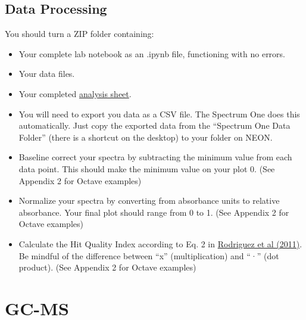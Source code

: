 \documentclass[]{tufte-book}
\providecommand{\tightlist}{%
  \setlength{\itemsep}{0pt}\setlength{\parskip}{0pt}}
\begin{document}
\hypertarget{data-processing-6}{%
\subsection{Data Processing}\label{data-processing-6}}

\begin{marginfigure}
You should turn a ZIP folder containing:

\begin{itemize}
\tightlist
\item
  Your complete lab notebook as an .ipynb file, functioning with no
  errors.\\
\item
  Your data files.\\
\item
  Your completed
  \href{https://github.com/alphonse/alphonse.github.io/raw/master/devel/chem370/assignments/excel-templates/rotation_ftir_data-analysis.xlsx}{analysis
  sheet}.
\end{itemize}
\end{marginfigure}

\begin{itemize}
\tightlist
\item
  You will need to export you data as a CSV file. The Spectrum One does this automatically. Just copy the exported data from the ``Spectrum One Data Folder'' (there is a shortcut on the desktop) to your folder on NEON.
\item
  Baseline correct your spectra by subtracting the minimum value from each data point. This should make the minimum value on your plot 0. (See Appendix 2 for Octave examples)
\item
  Normalize your spectra by converting from absorbance units to relative absorbance. Your final plot should range from 0 to 1. (See Appendix 2 for Octave examples)
\item
  Calculate the Hit Quality Index according to Eq. 2 in \href{https://www.researchgate.net/publication/51602215_Standardization_of_Raman_spectra_for_transfer_of_spectral_libraries_across_different_instruments}{Rodriguez et al (2011)}. Be mindful of the difference between ``x'' (multiplication) and ``·'' (dot product). (See Appendix 2 for Octave examples)
\end{itemize}

\newpage

\hypertarget{gc-ms-1}{%
\section{GC-MS}\label{gc-ms-1}}
\end{document}

